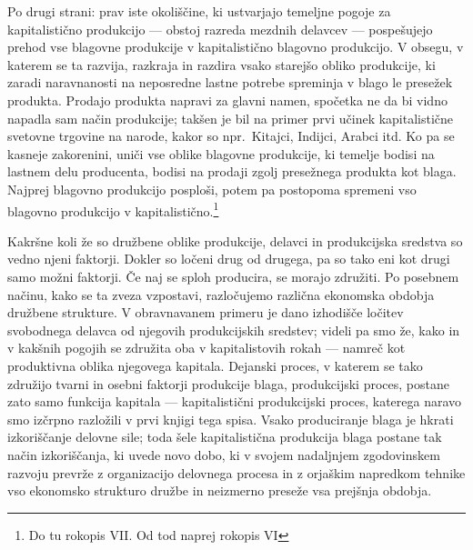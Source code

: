 \documentclass[a5paper]{scrbook}
\begin{document}
Po drugi strani: prav iste okoliščine, ki ustvarjajo temeljne pogoje za kapitalistično produkcijo --- obstoj razreda mezdnih delavcev --- pospešujejo prehod vse blagovne produkcije v kapitalistično blagovno produkcijo. V obsegu, v katerem se ta razvija, razkraja in razdira vsako starejšo obliko produkcije, ki zaradi naravnanosti na neposredne lastne potrebe spreminja v blago le presežek produkta. Prodajo produkta napravi za glavni namen, spočetka ne da bi vidno napadla sam način produkcije; takšen je bil na primer prvi učinek kapitalistične svetovne trgovine na narode, kakor so npr.\ Kitajci, Indijci, Arabci itd. Ko pa se kasneje zakorenini, uniči vse oblike blagovne produkcije, ki temelje bodisi na lastnem delu producenta, bodisi na prodaji zgolj presežnega produkta kot blaga. Najprej blagovno produkcijo posploši, potem pa postopoma spremeni vso blagovno produkcijo v kapitalistično.\footnote{Do tu rokopis VII. Od tod naprej rokopis VI}

Kakršne koli že so družbene oblike produkcije, delavci in produkcijska sredstva so vedno njeni faktorji. Dokler so ločeni drug od drugega, pa so tako eni kot drugi samo možni faktorji. Če naj se sploh producira, se morajo združiti. Po posebnem načinu, kako se ta zveza vzpostavi, razločujemo različna ekonomska obdobja družbene strukture. V obravnavanem primeru je dano izhodišče ločitev svobodnega delavca od njegovih produkcijskih sredstev; videli pa smo že, kako in v kakšnih pogojih se združita oba v kapitalistovih rokah --- namreč kot produktivna oblika njegovega kapitala. Dejanski proces, v katerem se tako združijo tvarni in osebni faktorji produkcije blaga, produkcijski proces, postane zato samo funkcija kapitala --- kapitalistični produkcijski proces, katerega naravo smo izčrpno razložili v prvi knjigi tega spisa. Vsako produciranje blaga je hkrati izkoriščanje delovne sile; toda šele kapitalistična produkcija blaga postane tak način izkoriščanja, ki uvede novo dobo, ki v svojem nadaljnjem zgodovinskem razvoju prevrže z organizacijo delovnega procesa in z orjaškim napredkom tehnike vso ekonomsko strukturo družbe in neizmerno preseže vsa prejšnja obdobja.
\end{document}
